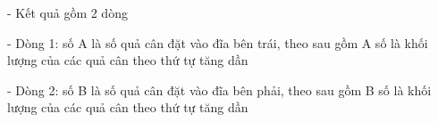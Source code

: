 - Kết quả gồm 2 dòng  

   - Dòng 1: số A là số quả cân đặt vào đĩa bên trái, theo sau gồm A số là khối lượng của các quả cân theo thứ tự tăng dần  

   - Dòng 2: số B là số quả cân đặt vào đĩa bên phải, theo sau gồm B số là khối lượng của các quả cân theo thứ tự tăng dần